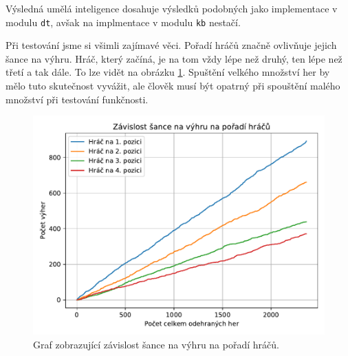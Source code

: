 \documentclass[a4paper,11pt]{article}
\begin{document}
	Výsledná umělá inteligence dosahuje výsledků podobných jako implementace v modulu \texttt{dt}, avšak na implmentace v modulu \texttt{kb} nestačí.
	
	Při testování jsme si všimli zajímavé věci. Pořadí hráčů značně ovlivňuje jejich šance na výhru. Hráč, který začíná, je na tom vždy lépe než druhý, ten lépe než třetí a tak dále. To lze vidět na obrázku \ref{fig:order}. Spuštění velkého množství her by mělo tuto skutečnost vyvážit, ale člověk musí být opatrný při spouštění malého množství při testování funkčnosti.
	
	\begin{figure}[h]
		\label{fig:order}
		\centering
		\includegraphics[scale=0.65]{win_prob.pdf}
		\caption{Graf zobrazující závislost šance na výhru na pořadí hráčů.}
	\end{figure}
	
\end{document}
